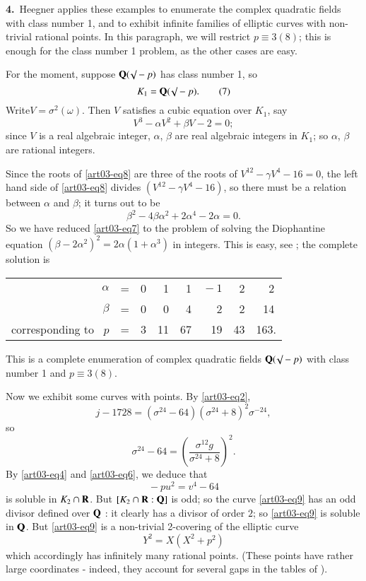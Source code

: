 \medskip
\noindent
{\bf 4.}~Heegner applies these examples to enumerate the complex quadratic fields with class number 1, and to exhibit infinite families of elliptic curves with non-trivial rational points. In this paragraph, we will restrict $p\equiv 3(8)$; this is enough for the class number 1 problem, as the other cases are easy.

For the moment, suppose $\mathbf{Q}(\surd -p)$ has class number 1, so
\begin{equation*}
K_{1}=\mathbf{Q}(\surd - p).\tag{7}\label{art03-eq7}
\end{equation*}
Write\pageoriginale $V=\sigma^{2}(\omega)$. Then $V$ satisfies a cubic equation over $K_{1}$, say
\begin{equation*}
V^{3}-\alpha V^{2}+\beta V-2=0;\tag{8}\label{art03-eq8}
\end{equation*}
since $V$ is a real algebraic integer, $\alpha$, $\beta$ are real algebraic integers in $K_{1}$; so $\alpha$, $\beta$ are rational integers.

Since the roots of \eqref{art03-eq8} are three of the roots of $V^{12}-\gamma V^{4}-16=0$, the left hand side of \eqref{art03-eq8} divides $(V^{12}-\gamma V^{4}-16)$, so there must be a relation between $\alpha$ and $\beta$; it turns out to be
$$
\beta^{2}-4\beta\alpha^{2}+2\alpha^{4}-2\alpha=0.
$$
So we have reduced \eqref{art03-eq7} to the problem of solving the Diophantine equation $(\beta-2\alpha^{2})^{2}=2\alpha(1+\alpha^{3})$ in integers. This is easy, see \cite{art03-key5}; the complete solution is
\begin{center}
\begin{tabular}{rrrrrrrr}
$\alpha$ & = & 0 & 1 & 1 & ${}-1$ & 2 & 2\,\\[3pt]
$\beta$ & = & 0 & 0 & 4 & 2 & 2 & 14\,\\[3pt]
corresponding to~ $p$ & = & 3 & 11 & 67 & 19 & 43 & 163.
\end{tabular}
\end{center}
This is a complete enumeration of complex quadratic fields $\mathbf{Q}(\surd-p)$ with class number 1 and $p\equiv 3(8)$.

Now we exhibit some curves with points. By \eqref{art03-eq2},
$$
j-1728=(\sigma^{24}-64)(\sigma^{24}+8)^{2}\sigma^{-24},
$$
so
$$
\sigma^{24}-64=\left(\dfrac{\sigma^{12}g}{\sigma^{24}+8}\right)^{2}.
$$
By \eqref{art03-eq4} and \eqref{art03-eq6}, we deduce that
\begin{equation*}
{}-pu^{2}=v^{4}-64\tag{9}\label{art03-eq9}
\end{equation*}
is soluble in $K_{2}\cap \mathbf{R}$. But $[K_{2}\cap \mathbf{R}:\mathbf{Q}]$ is odd; so the curve \eqref{art03-eq9} has an odd divisor defined over $\mathbf{Q}$ : it clearly has a divisor of order $2$; so \eqref{art03-eq9} is soluble in $\mathbf{Q}$. But \eqref{art03-eq9} is a non-trivial 2-covering of the elliptic curve
\begin{equation*}
Y^{2}=X(X^{2}+p^{2})\tag{10}\label{art03-eq10}
\end{equation*}
which accordingly has infinitely many rational points. (These points have rather large coordinates - indeed, they account for several gaps in the tables of \cite{art03-key2}).

